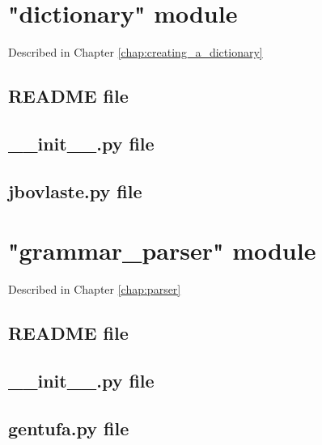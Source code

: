 \chapter{"dictionary" module}
\label{appendix:jbovlaste-annex}

Described in Chapter \ref{chap:creating_a_dictionary}

\section{README file}



\section{\_\_init\_\_.py file}



\section{jbovlaste.py file}



\chapter{"grammar\_parser" module}
\label{appendix:gentufa-annex}

Described in Chapter \ref{chap:parser}

\section{README file}



\section{\_\_init\_\_.py file}



\section{gentufa.py file}




